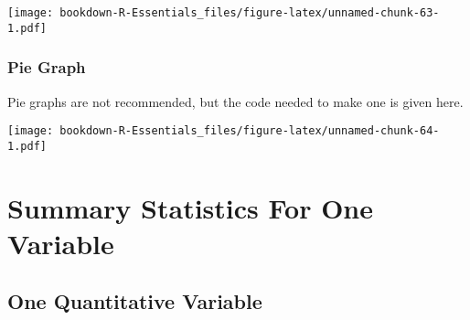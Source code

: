 \documentclass[
]{book}
\newenvironment{Shaded}{\begin{snugshade}}{\end{snugshade}}
\newcommand{\CommentTok}[1]{\textcolor[rgb]{0.56,0.35,0.01}{\textit{#1}}}
\newcommand{\DataTypeTok}[1]{\textcolor[rgb]{0.13,0.29,0.53}{#1}}
\newcommand{\DecValTok}[1]{\textcolor[rgb]{0.00,0.00,0.81}{#1}}
\newcommand{\KeywordTok}[1]{\textcolor[rgb]{0.13,0.29,0.53}{\textbf{#1}}}
\newcommand{\NormalTok}[1]{#1}
\newcommand{\OperatorTok}[1]{\textcolor[rgb]{0.81,0.36,0.00}{\textbf{#1}}}
\newcommand{\StringTok}[1]{\textcolor[rgb]{0.31,0.60,0.02}{#1}}
\begin{document}
\texttt{[image: bookdown-R-Essentials\_files/figure-latex/unnamed-chunk-63-1.pdf]}

\hypertarget{pie-graph}{%
\subsection{Pie Graph}\label{pie-graph}}

Pie graphs are not recommended, but the code needed to make one is given here.

\begin{Shaded}
\end{Shaded}

\texttt{[image: bookdown-R-Essentials\_files/figure-latex/unnamed-chunk-64-1.pdf]}

\hypertarget{summary-statistics-for-one-variable}{%
\chapter{Summary Statistics For One Variable}\label{summary-statistics-for-one-variable}}

\hypertarget{one-quantitative-variable}{%
\section{One Quantitative Variable}\label{one-quantitative-variable}}
\end{document}
